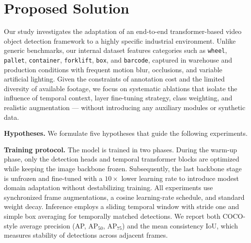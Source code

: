 \documentclass{article}
\begin{document}
\section{Proposed Solution}
\label{sec:method}

Our study investigates the adaptation of an end-to-end transformer-based video object detection framework to a highly specific industrial environment. 
Unlike generic benchmarks, our internal dataset features categories such as \texttt{wheel}, \texttt{pallet}, \texttt{container}, \texttt{forklift}, \texttt{box}, and \texttt{barcode}, captured in warehouse and production conditions with frequent motion blur, occlusions, and variable artificial lighting. 
Given the constraints of annotation cost and the limited diversity of available footage, we focus on systematic ablations that isolate the influence of temporal context, layer fine-tuning strategy, class weighting, and realistic augmentation — without introducing any auxiliary modules or synthetic data.

\vspace{4pt}
\noindent\textbf{Hypotheses.}
We formulate five hypotheses that guide the following experiments.  

\vspace{4pt}
\noindent\textbf{Training protocol.}
The model is trained in two phases. 
During the warm-up phase, only the detection heads and temporal transformer blocks are optimized while keeping the image backbone frozen. 
Subsequently, the last backbone stage is unfrozen and fine-tuned with a $10\times$ lower learning rate to introduce modest domain adaptation without destabilizing training. 
All experiments use synchronized frame augmentations, a cosine learning-rate schedule, and standard weight decay. 
Inference employs a sliding temporal window with stride one and simple box averaging for temporally matched detections. 
We report both COCO-style average precision (AP, AP$_{50}$, AP$_{75}$) and the mean consistency IoU, which measures stability of detections across adjacent frames.
\end{document}
